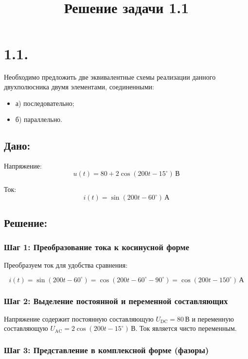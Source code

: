 \documentclass{article}
\begin{document}
\title{Решение задачи 1.1}
\date{}
\maketitle

\section*{1.1.}

Необходимо предложить две эквивалентные схемы реализации данного двухполюсника двумя элементами, соединенными:

\begin{itemize}
    \item а) последовательно;
    \item б) параллельно.
\end{itemize}

\subsection*{Дано:}

Напряжение:
\[
u(t) = 80 + 2\cos(200t - 15^\circ) \, \text{В}
\]

Ток:
\[
i(t) = \sin(200t - 60^\circ) \, \text{А}
\]

\subsection*{Решение:}

\subsubsection*{Шаг 1: Преобразование тока к косинусной форме}

Преобразуем ток для удобства сравнения:

\[
i(t) = \sin(200t - 60^\circ) = \cos\left(200t - 60^\circ - 90^\circ\right) = \cos(200t - 150^\circ) \, \text{А}
\]

\subsubsection*{Шаг 2: Выделение постоянной и переменной составляющих}

Напряжение содержит постоянную составляющую \( U_{\text{DC}} = 80 \, \text{В} \) и переменную составляющую \( U_{\text{AC}} = 2\cos(200t - 15^\circ) \, \text{В} \). Ток является чисто переменным.

\subsubsection*{Шаг 3: Представление в комплексной форме (фазоры)}
\end{document}
